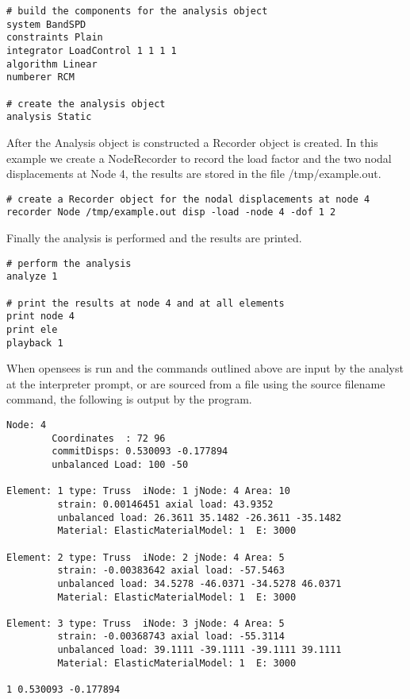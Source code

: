 \documentclass[12pt]{article}
\begin{document}
{\sf\small \begin{verbatim}
# build the components for the analysis object
system BandSPD
constraints Plain
integrator LoadControl 1 1 1 1
algorithm Linear
numberer RCM

# create the analysis object 
analysis Static 
\end{verbatim} }

After the Analysis object is constructed a Recorder object is
created. In this example we create a NodeRecorder to record the
load factor and the two nodal displacements at Node 4, the results are
stored in the file {\sf /tmp/example.out}.

{\sf\small \begin{verbatim}
# create a Recorder object for the nodal displacements at node 4
recorder Node /tmp/example.out disp -load -node 4 -dof 1 2
\end{verbatim} }

Finally the analysis is performed and the results are printed. 

{\sf\small \begin{verbatim}
# perform the analysis
analyze 1

# print the results at node 4 and at all elements
print node 4
print ele
playback 1
\end{verbatim} }

When opensees is run and the commands outlined above are input by the analyst at the
interpreter prompt, or are sourced from a file using the {\sf source
filename} command, the following is output by the program. 

{\sf\small
\begin{verbatim}
Node: 4
        Coordinates  : 72 96 
        commitDisps: 0.530093 -0.177894 
        unbalanced Load: 100 -50 

Element: 1 type: Truss  iNode: 1 jNode: 4 Area: 10 
         strain: 0.00146451 axial load: 43.9352 
         unbalanced load: 26.3611 35.1482 -26.3611 -35.1482 
         Material: ElasticMaterialModel: 1  E: 3000

Element: 2 type: Truss  iNode: 2 jNode: 4 Area: 5 
         strain: -0.00383642 axial load: -57.5463 
         unbalanced load: 34.5278 -46.0371 -34.5278 46.0371 
         Material: ElasticMaterialModel: 1  E: 3000

Element: 3 type: Truss  iNode: 3 jNode: 4 Area: 5 
         strain: -0.00368743 axial load: -55.3114 
         unbalanced load: 39.1111 -39.1111 -39.1111 39.1111 
         Material: ElasticMaterialModel: 1  E: 3000

1 0.530093 -0.177894
\end{verbatim}
}
\end{document}
